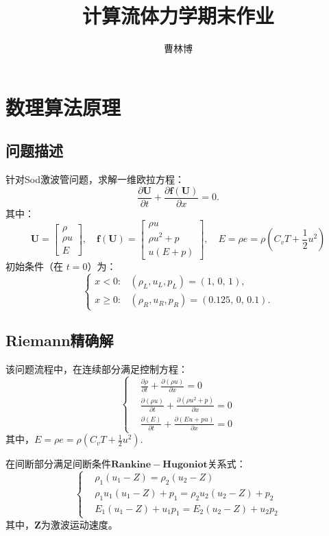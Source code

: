 \documentclass[12pt,a4paper]{article}%
\title{\fontsize{18pt}{27pt}\selectfont%
	{\heiti%
		计算流体力学期末作业}}%
\author{\fontsize{12pt}{18pt}\selectfont%
	{\fangsong%
		曹林博 \quad 2200011012}} %
\date{}%
\begin{document}
	\maketitle
	
	\section{数理算法原理}
		\subsection{问题描述}
		针对Sod激波管问题，求解一维欧拉方程：
		\[
		 	\frac{\partial \mathbf{U}}{\partial t} + \frac{\partial \mathbf{f}(\mathbf{U})}{\partial x} = 0.
		\]
		其中：
		\[
		\mathbf{U} = 
		\begin{bmatrix}
		 	\rho \\
		 	\rho u \\
		 	E
		\end{bmatrix}, \quad
		\mathbf{f}(\mathbf{U}) = 
		\begin{bmatrix}
		 	\rho u \\
		 	\rho u^2 + p \\
		 	u(E + p)
		\end{bmatrix}, \quad
		E = \rho e = \rho \left( C_v T + \frac{1}{2} u^2 \right)
		\]
		初始条件（在 $t=0$）为：
		\[
		\begin{cases}
		 	x < 0: & (\rho_L, u_L, p_L) = (1,\, 0,\, 1), \\
		 	x \ge 0: & (\rho_R, u_R, p_R) = (0.125,\, 0,\, 0.1).
		\end{cases}
		\]
		
		\subsection{Riemann精确解}
		该问题流程中，在连续部分满足控制方程：
		\[
		\left\{
		\begin{aligned}
		 	&\frac{\partial \rho}{\partial t} + \frac{\partial (\rho u)}{\partial x} = 0 \\
		 	&\frac{\partial (\rho u)}{\partial t} + \frac{\partial (\rho u^2 + p)}{\partial x} = 0 \\
		 	&\frac{\partial (E)}{\partial t} + \frac{\partial (E u + p u)}{\partial x} = 0
		\end{aligned}
		\right.
		\]
		其中，$E = \rho e = \rho (C_v T + \frac{1}{2} u^2)$.
		
		在间断部分满足间断条件$\mathbf{Rankine-Hugoniot}$关系式：
		\[
		\left\{
		\begin{aligned}
		 	& \rho_1(u_1 - Z) = \rho_2(u_2 - Z) \\
		 	& \rho_1 u_1(u_1 - Z) + p_1 = \rho_2 u_2(u_2 - Z) + p_2 \\
		 	& E_1(u_1 - Z) + u_1 p_1 = E_2(u_2 - Z) + u_2 p_2
		\end{aligned}
		\right.
		\]
		其中，$\mathbf{Z}$为激波运动速度。
		
\end{document}

